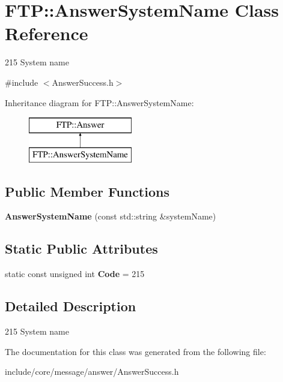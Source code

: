 \hypertarget{class_f_t_p_1_1_answer_system_name}{\section{F\-T\-P\-:\-:Answer\-System\-Name Class Reference}
\label{class_f_t_p_1_1_answer_system_name}
}


215 System name  




{\ttfamily \#include $<$Answer\-Success.\-h$>$}

Inheritance diagram for F\-T\-P\-:\-:Answer\-System\-Name\-:\begin{figure}[H]
\begin{center}
\leavevmode
\includegraphics[height=2.000000cm]{class_f_t_p_1_1_answer_system_name}
\end{center}
\end{figure}
\subsection*{Public Member Functions}
\begin{DoxyCompactItemize}
\item 
\hypertarget{class_f_t_p_1_1_answer_system_name_a435757c81d82db47f1935c241c906023}{{\bfseries Answer\-System\-Name} (const std\-::string \&system\-Name)}\label{class_f_t_p_1_1_answer_system_name_a435757c81d82db47f1935c241c906023}

\end{DoxyCompactItemize}
\subsection*{Static Public Attributes}
\begin{DoxyCompactItemize}
\item 
\hypertarget{class_f_t_p_1_1_answer_system_name_af8ce22730f7209c5c72d3827fe6eb3b3}{static const unsigned int {\bfseries Code} = 215}\label{class_f_t_p_1_1_answer_system_name_af8ce22730f7209c5c72d3827fe6eb3b3}

\end{DoxyCompactItemize}


\subsection{Detailed Description}
215 System name 

The documentation for this class was generated from the following file\-:\begin{DoxyCompactItemize}
\item 
include/core/message/answer/Answer\-Success.\-h\end{DoxyCompactItemize}
